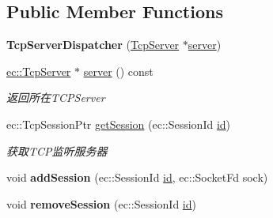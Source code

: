 \subsection*{Public Member Functions}
\begin{DoxyCompactItemize}
\item 
\hypertarget{classec_1_1TcpServerDispatcher_a0fcac28c897fdccaabf54ddd1f718caa}{{\bfseries Tcp\-Server\-Dispatcher} (\hyperlink{classec_1_1TcpServer}{Tcp\-Server} $\ast$\hyperlink{classec_1_1TcpServerDispatcher_a39d87af5d64dda19f3312c37456c2418}{server})}\label{classec_1_1TcpServerDispatcher_a0fcac28c897fdccaabf54ddd1f718caa}

\item 
\hypertarget{classec_1_1TcpServerDispatcher_a39d87af5d64dda19f3312c37456c2418}{\hyperlink{classec_1_1TcpServer}{ec\-::\-Tcp\-Server} $\ast$ \hyperlink{classec_1_1TcpServerDispatcher_a39d87af5d64dda19f3312c37456c2418}{server} () const }\label{classec_1_1TcpServerDispatcher_a39d87af5d64dda19f3312c37456c2418}

\begin{DoxyCompactList}\small\item\em 返回所在\-T\-C\-P\-Server \end{DoxyCompactList}\item 
\hypertarget{classec_1_1TcpServerDispatcher_acdc755e605191a51778baddf03b425cd}{ec\-::\-Tcp\-Session\-Ptr \hyperlink{classec_1_1TcpServerDispatcher_acdc755e605191a51778baddf03b425cd}{get\-Session} (ec\-::\-Session\-Id \hyperlink{classec_1_1Loop_ae60730f9a1e07de6039de8008293769a}{id})}\label{classec_1_1TcpServerDispatcher_acdc755e605191a51778baddf03b425cd}

\begin{DoxyCompactList}\small\item\em 获取\-T\-C\-P监听服务器 \end{DoxyCompactList}\item 
\hypertarget{classec_1_1TcpServerDispatcher_a4a0971bd2d689ddb929dafc14a1f67c3}{void {\bfseries add\-Session} (ec\-::\-Session\-Id \hyperlink{classec_1_1Loop_ae60730f9a1e07de6039de8008293769a}{id}, ec\-::\-Socket\-Fd sock)}\label{classec_1_1TcpServerDispatcher_a4a0971bd2d689ddb929dafc14a1f67c3}

\item 
\hypertarget{classec_1_1TcpServerDispatcher_a321009d6e4803ec04ecfddb5af7988de}{void {\bfseries remove\-Session} (ec\-::\-Session\-Id \hyperlink{classec_1_1Loop_ae60730f9a1e07de6039de8008293769a}{id})}\label{classec_1_1TcpServerDispatcher_a321009d6e4803ec04ecfddb5af7988de}

\end{DoxyCompactItemize}
